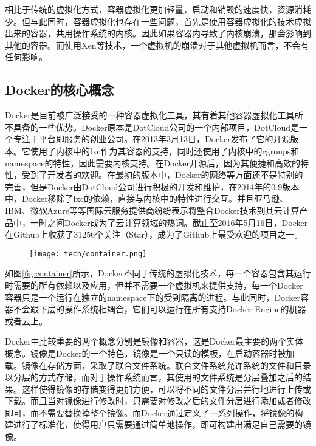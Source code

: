 相比于传统的虚拟化方式，容器虚拟化更加轻量，启动和销毁的速度快，资源消耗少。但与此同时，容器虚拟化也存在一些问题，首先是使用容器虚拟化的技术虚拟出来的容器，共用操作系统的内核。因此如果容器内导致了内核崩溃，那会影响到其他的容器。而使用Xen等技术，一个虚拟机的崩溃对于其他虚拟机而言，不会有任何影响。\supercite{dua2014virtualization}

\subsection{Docker的核心概念}

Docker是目前被广泛接受的一种容器虚拟化工具，其有着其他容器虚拟化工具所不具备的一些优势。Docker原本是DotCloud公司的一个内部项目，DotCloud是一个专注于平台即服务的创业公司。在2013年3月13日，Docker发布了它的开源版本。它使用了内核中的lxc作为其容器的支持，同时还使用了内核中的cgroups和namespace的特性，因此需要内核支持。在Docker开源后，因为其便捷和高效的特性，受到了开发者的欢迎。在最初的版本中，Docker的网络等方面还不是特别的完善，但是Docker由DotCloud公司进行积极的开发和维护，在2014年的0.9版本中，Docker移除了lxc的依赖，直接与内核中的特性进行交互。并且亚马逊、IBM、微软Azure等等国际云服务提供商纷纷表示将整合Docker技术到其云计算产品中，一时之间Docker成为了云计算领域的热词。截止至2016年5月16日，Docker在Github上收获了31256个关注（Star），成为了Github上最受欢迎的项目之一。

\begin{figure}[!htp]
  \centering
  \texttt{[image: tech/container.png]}
\end{figure}

如图\ref{fig:container}所示，Docker不同于传统的虚拟化技术，每一个容器包含其运行时需要的所有依赖以及应用，但并不需要一个虚拟机来提供支持，每一个Docker容器只是一个运行在独立的namespace下的受到隔离的进程。与此同时，Docker容器不会跟下层的操作系统相耦合，它们可以运行在所有支持Docker Engine的机器或者云上。

Docker中比较重要的两个概念分别是镜像和容器，这是Docker最主要的两个实体概念。镜像是Docker的一个特色，镜像是一个只读的模板，在启动容器时被加载。镜像在存储方面，采取了联合文件系统。联合文件系统允许系统的文件和目录以分层的方式存储，而对于操作系统而言，其使用的文件系统是分层叠加之后的结果。这样使得镜像的存储变得更加方便，可以将不同的文件分层并行地进行上传或下载。而且当对镜像进行修改时，只需要对修改之后的文件分层进行添加或者修改即可，而不需要替换掉整个镜像。而Docker通过定义了一系列操作，将镜像的构建进行了标准化，使得用户只需要通过简单地操作，即可构建出满足自己需要的镜像。

